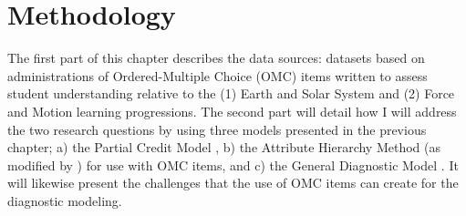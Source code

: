 \chapter{Methodology}

The first part of this chapter describes the data sources: datasets based on administrations of Ordered-Multiple Choice (OMC) items written to assess student understanding relative to the (1) Earth and Solar System and (2) Force and Motion learning progressions. The second part will detail how I will address the two research questions by using three models presented in the previous chapter; a) the Partial Credit Model \cite{Masters1982,EmbretsonReise2000}, b) the Attribute Hierarchy Method (as modified by  ) for use with OMC items, and c) the General Diagnostic Model \cite{vonDavier2008}. It will likewise present the challenges that the use of OMC items can create for the diagnostic modeling.

